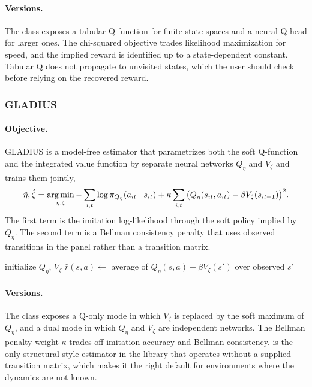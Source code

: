 \paragraph{Versions.} The  class exposes a tabular Q-function for finite state spaces and a neural Q head for larger ones. The chi-squared objective trades likelihood maximization for speed, and the implied reward is identified up to a state-dependent constant. Tabular Q does not propagate to unvisited states, which the user should check before relying on the recovered reward.

\subsubsection{GLADIUS}

\paragraph{Objective.} GLADIUS \citep{kang2025gladius} is a model-free estimator that parametrizes both the soft Q-function and the integrated value function by separate neural networks $Q_\eta$ and $V_\zeta$ and trains them jointly,
\begin{equation}
\hat\eta, \hat\zeta = \operatorname*{arg\,min}_{\eta, \zeta} -\sum_{i, t} \log \pi_{Q_\eta}(a_{it} \mid s_{it}) + \kappa \sum_{i, t} \big( Q_\eta(s_{it}, a_{it}) - \beta V_\zeta(s_{it+1}) \big)^2.
\label{eq:gladius}
\end{equation}
The first term is the imitation log-likelihood through the soft policy implied by $Q_\eta$. The second term is a Bellman consistency penalty that uses observed transitions in the panel rather than a transition matrix.

\begin{algorithm}[H]
\SetAlgoLined
initialize $Q_\eta$, $V_\zeta$\;
$\hat r(s, a) \leftarrow$ average of $Q_\eta(s, a) - \beta V_\zeta(s')$ over observed $s'$\;
\caption{GLADIUS dual-network training}
\end{algorithm}

\paragraph{Versions.} The  class exposes a Q-only mode in which $V_\zeta$ is replaced by the soft maximum of $Q_\eta$, and a dual mode in which $Q_\eta$ and $V_\zeta$ are independent networks. The Bellman penalty weight $\kappa$ trades off imitation accuracy and Bellman consistency.  is the only structural-style estimator in the library that operates without a supplied transition matrix, which makes it the right default for environments where the dynamics are not known.

